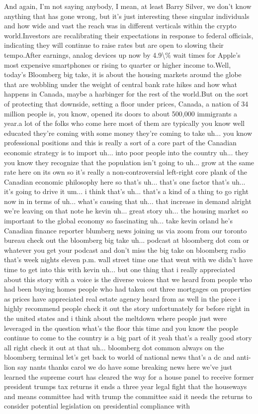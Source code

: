 \documentclass{article}%
\begin{document}
And again, I'm not saying anybody, I mean, at least Barry Silver, we don't know anything that has gone wrong, but it's just interesting these singular individuals and how wide and vast the reach was in different verticals within the crypto world.Investors are recalibrating their expectations in response to federal officials, indicating they will continue to raise rates but are open to slowing their tempo.After earnings, analog devices up now by 4.9\textbackslash{}\% wait times for Apple's most expensive smartphones or rising to quarter or higher income to.Well, today's Bloomberg big take, it is about the housing markets around the globe that are wobbling under the weight of central bank rate hikes and how what happens in Canada, maybe a harbinger for the rest of the world.But on the sort of protecting that downside, setting a floor under prices, Canada, a nation of 34 million people is, you know, opened its doors to about 500,000 immigrants a year.a lot of the folks who come here most of them are typically you know well educated they're coming with some money they're coming to take uh... you know professional positions and this is really a sort of a core part of the Canadian economic strategy is to import uh... into poor people into the country uh... they you know they recognize that the population isn't going to uh... grow at the same rate here on its own so it's really a non{-}controversial left{-}right core plank of the Canadian economic philosophy here so that's uh... that's one factor that's uh... it's going to drive it um... i think that's uh... that's a kind of a thing to go right now in in terms of uh... what's causing that uh... that increase in demand alright we're leaving on that note he kevin uh... great story uh... the housing market so important to the global economy so fascinating uh... take kevin orland he's Canadian finance reporter blumberg news joining us via zoom from our toronto bureau check out the bloomberg big take uh... podcast at bloomberg dot com or whatever you get your podcast and don't miss the big take on bloomberg radio that's week nights eleven p.m. wall street time one that went with we didn't have time to get into this with kevin uh... but one thing that i really appreciated about this story with a voice is the diverse voices that we heard from people who had been buying homes people who had taken out three mortgages on properties as prices have appreciated real estate agency heard from as well in the piece i highly recommend people check it out the story unfortunately for before right in the united states and i think about the meltdown where people just were leveraged in the question what's the floor this time and you know the people continue to come to the country is a big part of it yeah that's a really good story all right check it out at that uh... bloomberg dot common always on the bloomberg terminal let's get back to world of national news that's a dc and anti{-}lion say nants thanks carol we do have some breaking news here we've just learned the supreme court has cleared the way for a house panel to receive former president trumps tax returns it ends a three year legal fight that the houseways and means committee had with trump the committee said it needs the returns to consider potential legislation on presidential compliance with 
\end{document}
